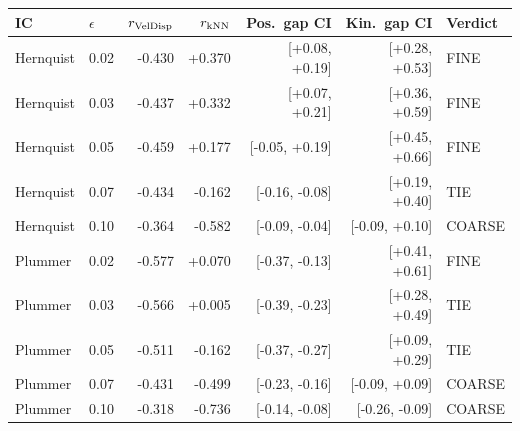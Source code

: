 \begin{tabular}{llrrrrl}
\toprule
IC & $\epsilon$ & $r_{\rm VelDisp}$ & $r_{\rm kNN}$ & Pos.~gap CI & Kin.~gap CI & Verdict\\
\midrule
Hernquist & 0.02 & -0.430 & +0.370 & [+0.08, +0.19] & [+0.28, +0.53] & FINE\\
Hernquist & 0.03 & -0.437 & +0.332 & [+0.07, +0.21] & [+0.36, +0.59] & FINE\\
Hernquist & 0.05 & -0.459 & +0.177 & [-0.05, +0.19] & [+0.45, +0.66] & FINE\\
Hernquist & 0.07 & -0.434 & -0.162 & [-0.16, -0.08] & [+0.19, +0.40] & TIE\\
Hernquist & 0.10 & -0.364 & -0.582 & [-0.09, -0.04] & [-0.09, +0.10] & COARSE\\
\midrule
Plummer & 0.02 & -0.577 & +0.070 & [-0.37, -0.13] & [+0.41, +0.61] & FINE\\
Plummer & 0.03 & -0.566 & +0.005 & [-0.39, -0.23] & [+0.28, +0.49] & TIE\\
Plummer & 0.05 & -0.511 & -0.162 & [-0.37, -0.27] & [+0.09, +0.29] & TIE\\
Plummer & 0.07 & -0.431 & -0.499 & [-0.23, -0.16] & [-0.09, +0.09] & COARSE\\
Plummer & 0.10 & -0.318 & -0.736 & [-0.14, -0.08] & [-0.26, -0.09] & COARSE\\
\bottomrule
\end{tabular}
